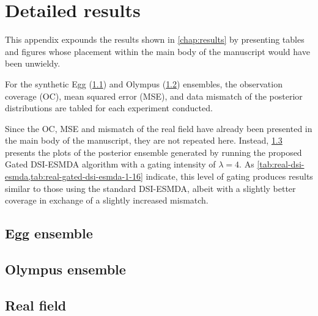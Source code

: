 \chapter{Detailed results}
\label{chap:detailed-results}

This appendix expounds the results shown in \cref{chap:results}
by presenting tables and figures whose placement within the main body of the manuscript would have been unwieldy.

For the synthetic 
Egg (\cref{sec:detailed-egg-ensemble}) and 
Olympus (\cref{sec:detailed-olympus-ensemble})
ensembles, the observation coverage (OC), mean squared error (MSE), and data mismatch 
of the posterior distributions are tabled for each experiment conducted.

Since the OC, MSE and mismatch of the real field have already been presented in the main body of the manuscript,
they are not repeated here. 
%
Instead, \cref{sec:detailed-real_field-ensemble} 
presents the plots of the posterior ensemble generated by running the proposed Gated DSI-ESMDA algorithm
with a gating intensity of $\lambda=4$.
%
As \cref{tab:real-dsi-esmda,tab:real-gated-dsi-esmda-1-16} indicate, 
this level of gating produces results similar to those using the standard DSI-ESMDA,
albeit with a slightly better coverage in exchange of a slightly increased mismatch.

\section{Egg ensemble}
\label{sec:detailed-egg-ensemble}
    

\section{Olympus ensemble}
\label{sec:detailed-olympus-ensemble}
    

\section{Real field}
\label{sec:detailed-real_field-ensemble}
    